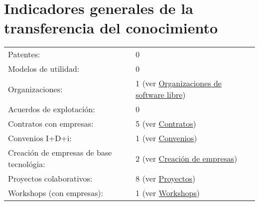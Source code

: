 \documentclass[a4paper]{article}
\begin{document}
\section*{Indicadores generales de la transferencia del conocimiento}
\begin{tabular}{ll}
Patentes: & 0 \\
Modelos de utilidad: & 0 \\
Organizaciones: & 1 (ver \hyperref[sec:organizations]{Organizaciones de software libre}) \\
Acuerdos de explotación: & 0 \\
Contratos con empresas: & 5 (ver \hyperref[sec:contratos]{Contratos})\\
Convenios I+D+i: & 1 (ver \hyperref[sec:convenios]{Convenios}) \\
Creación de empresas de base tecnológia: & 2 (ver \hyperref[sec:empresas]{Creación de empresas})\\
Proyectos colaborativos: & 8 (ver \hyperref[sec:proyectos]{Proyectos}) \\
Workshops (con empresas): & 1 (ver \hyperref[sec:workshops]{Workshops})
\end{tabular}

%
\end{document}
